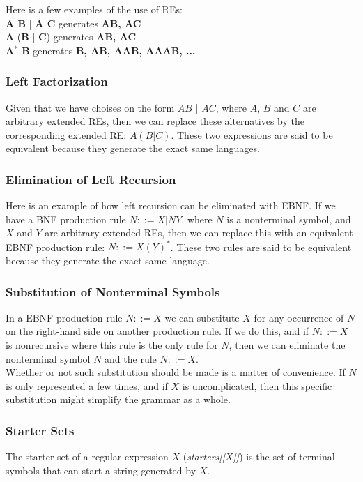 Here is a few examples of the use of REs: \\
\textbf{A B} | \textbf{A C} generates \textbf{{AB, AC}} \\
\textbf{A} (\textbf{B} | \textbf{C}) generates \textbf{{AB, AC}} \\
\textbf{A$^*$ B} generates \textbf{{B, AB, AAB, AAAB, ...}} \\


\subsubsection*{Left Factorization}
Given that we have choises on the form $A B$ | $A C$, where $A$, $B$ and $C$ are arbitrary extended REs, then we can replace these alternatives by the corresponding extended RE: $A (B | C)$. These two expressions are said to be equivalent because they generate the exact same languages.

\subsubsection*{Elimination of Left Recursion}
Here is an example of how left recursion can be eliminated with EBNF. If we have a BNF production rule $N ::= X | N Y$, where $N$ is a nonterminal symbol, and $X$ and $Y$ are arbitrary extended REs, then we can replace this with an equivalent EBNF production rule: $N ::= X (Y)^*$. These two rules are said to be equivalent because they generate the exact same language.

\subsubsection*{Substitution of Nonterminal Symbols}
In a EBNF production rule $N::=X$ we can substitute $X$ for any occurrence of $N$ on the right-hand side on another production rule. If we do this, and if $N::=X$ is nonrecursive where this rule is the only rule for $N$, then we can eliminate the nonterminal symbol $N$ and the rule $N::=X$.\\ \indent
Whether or not such substitution should be made is a matter of convenience. If $N$ is only represented a few times, and if $X$ is uncomplicated, then this specific substitution might simplify the grammar as a whole.

\subsubsection*{Starter Sets}
The starter set of a regular expression $X$ (\textit{starters[[$X$]]}) is the set of terminal symbols that can start a string generated by $X$.